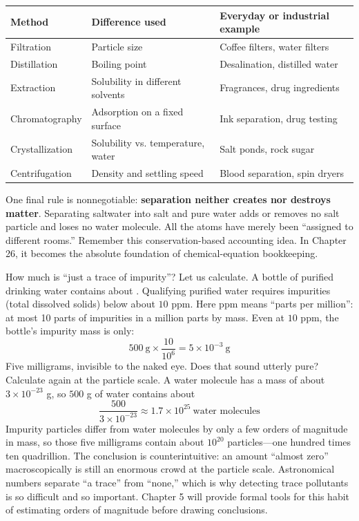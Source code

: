 \begin{table}[htbp]
\centering
\begin{tabular}{lll}
\toprule
Method & Difference used & Everyday or industrial example \\
\midrule
Filtration & Particle size & Coffee filters, water filters \\
Distillation & Boiling point & Desalination, distilled water \\
Extraction & Solubility in different solvents & Fragrances, drug ingredients \\
Chromatography & Adsorption on a fixed surface & Ink separation, drug testing \\
Crystallization & Solubility vs. temperature, water & Salt ponds, rock sugar \\
Centrifugation & Density and settling speed & Blood separation, spin dryers \\
\bottomrule
\end{tabular}
\end{table}

One final rule is nonnegotiable: \textbf{separation neither creates nor destroys matter}. Separating saltwater into salt and pure water adds or removes no salt particle and loses no water molecule. All the atoms have merely been ``assigned to different rooms.'' Remember this conservation-based accounting idea. In Chapter 26, it becomes the absolute foundation of chemical-equation bookkeeping.

\begin{qiaoliang}
How much is ``just a trace of impurity''? Let us calculate. A bottle of purified drinking water contains about . Qualifying purified water requires impurities (total dissolved solids) below about $10$ ppm. Here ppm means ``parts per million'': at most 10 parts of impurities in a million parts by mass. Even at $10$ ppm, the bottle's impurity mass is only:
\[500\ \mathrm{g} \times \frac{10}{10^{6}} = 5\times 10^{-3}\ \mathrm{g}\]
Five milligrams, invisible to the naked eye. Does that sound utterly pure? Calculate again at the particle scale. A water molecule has a mass of about $3\times 10^{-23}$ g, so $500$ g of water contains about
\[\frac{500}{3\times 10^{-23}} \approx 1.7\times 10^{25}\ \text{water molecules}\]
Impurity particles differ from water molecules by only a few orders of magnitude in mass, so those five milligrams contain about $10^{20}$ particles---one hundred times ten quadrillion. The conclusion is counterintuitive: an amount ``almost zero'' macroscopically is still an enormous crowd at the particle scale. Astronomical numbers separate ``a trace'' from ``none,'' which is why detecting trace pollutants is so difficult and so important. Chapter 5 will provide formal tools for this habit of estimating orders of magnitude before drawing conclusions.
\end{qiaoliang}


